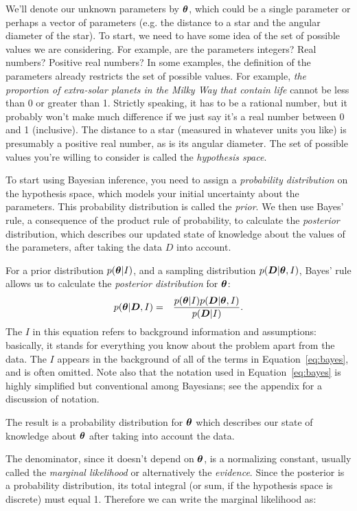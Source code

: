 We'll denote our unknown parameters by $\boldsymbol{\theta}$, which could be a single
parameter or perhaps a vector of parameters (e.g. the distance to a star
and the angular diameter of the star). To start, we
need to have some idea of the set of possible values we are considering. For
example, are the parameters integers? Real numbers? Positive real numbers?
In some examples, the definition of the parameters already restricts the set
of possible values. For example, {\it the proportion of extra-solar planets in
the Milky Way that contain life} cannot be less than 0 or greater than 1.
Strictly speaking, it has to be a rational number, but it probably won't make
much difference if we just say it's a real number between 0 and 1 (inclusive).
The distance to a star (measured in whatever units you like) is presumably a
positive real number, as is its angular diameter.
The set of possible values you're willing to consider is called the
{\it hypothesis space}.

To start using Bayesian inference, you need to assign a {\it probability
distribution} on the hypothesis space, which models your initial uncertainty
about the parameters. This probability distribution is called the {\it prior}.
We then use Bayes' rule, a consequence of the product rule of probability,
to calculate the {\it posterior} distribution, which describes our updated
state of knowledge about the values of the parameters, after taking the data
$D$ into account.

For a prior distribution $p(\boldsymbol{\theta} | I)$, and a sampling
distribution $p(\boldsymbol{D} | \boldsymbol{\theta}, I)$, Bayes' rule allows us to calculate
the {\it posterior distribution} for $\boldsymbol{\theta}$:
\begin{eqnarray}
p(\boldsymbol{\theta} | \boldsymbol{D}, I) &=& \frac{p(\boldsymbol{\theta} | I)p(\boldsymbol{D} | \boldsymbol{\theta}, I)}{p(\boldsymbol{D} | I)}.\label{eq:bayes}
\end{eqnarray}
The $I$ in this equation refers to background information and assumptions:
basically, it stands for everything you know about the problem apart from the
data. The $I$ appears in the background of all of the terms in
Equation~\ref{eq:bayes}, and is often omitted. Note also that the notation
used in Equation~\ref{eq:bayes} is highly simplified but conventional among
Bayesians; see the appendix for a discussion of notation.

The result is a probability distribution for $\boldsymbol{\theta}$ which describes
our state of knowledge about $\boldsymbol{\theta}$ after taking into account the data.

The denominator, since it doesn't depend on $\boldsymbol{\theta}$, is a normalizing
constant, usually called the {\it marginal likelihood} or alternatively the
{\it evidence}. Since the posterior is a probability distribution, its
total integral (or sum, if the
hypothesis space is discrete) must equal 1. Therefore we can write the
marginal likelihood as:

